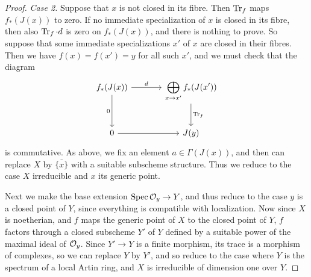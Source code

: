 \begin{proof}
\medskip\noindent\textit{Case 2.} Suppose that $x$ is not closed in its fibre. Then $\operatorname{Tr}_{f}$ maps $f_{*}(J(x))$ to zero. If no immediate specialization of $x$ is closed in its fibre, then also $\operatorname{Tr}_{f} \cdot d$ is zero on $f_{*}(J(x))$, and there is nothing to prove. So suppose that some immediate specializations $x'$ of $x$ are closed in their fibres. Then we have $f(x) = f(x') = y$ for all such $x'$, and we must check that the diagram
\[
\begin{tikzcd}[row sep=large, column sep=large]
f_{*}(J(x)) \ar[r,"d"] \ar[d,"0"'] & \displaystyle\bigoplus_{x\rightarrow x'} f_{*}(J(x')) \ar[d,"\Tr_{f}"] \\
0 \ar[r] & J(y)
\end{tikzcd}
\]
is commutative. As above, we fix an element $a \in \Gamma(J(x))$, and then can replace $X$ by $\overline{\{x\}}$ with a suitable subscheme structure. Thus we reduce to the case $X$ irreducible and $x$ its generic point.

Next we make the base extension $\operatorname{Spec} \mathcal{O}_{y} \to Y$, and thus reduce to the case $y$ is a closed point of $Y$, since everything is compatible with localization. Now since $X$ is noetherian, and $f$ maps the generic point of $X$ to the closed point of $Y$, $f$ factors through a closed subscheme $Y'$ of $Y$ defined by a suitable power of the maximal ideal of $\mathcal{O}_{y}$. Since $Y' \to Y$ is a finite morphism, its trace is a morphism of complexes, so we can replace $Y$ by $Y'$, and so reduce to the case where $Y$ is the spectrum of a local Artin ring, and $X$ is irreducible of dimension one over $Y$.


\end{proof}
